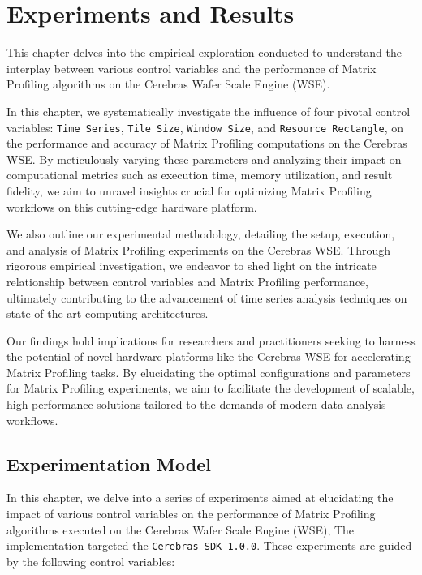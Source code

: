 \chapter{Experiments and Results}\label{chapter:measurements}

This chapter delves into the empirical exploration conducted to understand the interplay between various control variables and the performance of Matrix Profiling algorithms on the Cerebras Wafer Scale Engine (WSE).

In this chapter, we systematically investigate the influence of four pivotal control variables: \texttt{Time Series}, \texttt{Tile Size}, \texttt{Window Size}, and \texttt{Resource Rectangle}, on the performance and accuracy of Matrix Profiling computations on the Cerebras WSE. By meticulously varying these parameters and analyzing their impact on computational metrics such as execution time, memory utilization, and result fidelity, we aim to unravel insights crucial for optimizing Matrix Profiling workflows on this cutting-edge hardware platform.

We also outline our experimental methodology, detailing the setup, execution, and analysis of Matrix Profiling experiments on the Cerebras WSE. Through rigorous empirical investigation, we endeavor to shed light on the intricate relationship between control variables and Matrix Profiling performance, ultimately contributing to the advancement of time series analysis techniques on state-of-the-art computing architectures.

Our findings hold implications for researchers and practitioners seeking to harness the potential of novel hardware platforms like the Cerebras WSE for accelerating Matrix Profiling tasks. By elucidating the optimal configurations and parameters for Matrix Profiling experiments, we aim to facilitate the development of scalable, high-performance solutions tailored to the demands of modern data analysis workflows.

\clearpage

\section{Experimentation Model} \label{section:model}

In this chapter, we delve into a series of experiments aimed at elucidating the impact of various control variables on the performance of Matrix Profiling algorithms executed on the Cerebras Wafer Scale Engine (WSE), The implementation targeted the \texttt{Cerebras SDK 1.0.0}. These experiments are guided by the following control variables:

